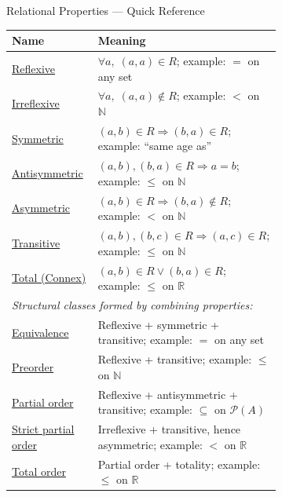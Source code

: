

\begin{toolkitbox}{Relational Properties --- Quick Reference}
\small
\begin{tabular}{l p{0.68\linewidth}}
\toprule
\textbf{Name}  & \textbf{Meaning} \\
\midrule
\hyperref[def:reflexive]{Reflexive}       & $\forall a,\; (a,a)\in R$; example: $=$ on any set \\
\hyperref[def:irreflexive]{Irreflexive}     & $\forall a,\; (a,a)\notin R$; example: $<$ on $\mathbb{N}$ \\
\hyperref[def:symmetric]{Symmetric}       & $(a,b)\in R \Rightarrow (b,a)\in R$; example: ``same age as'' \\
\hyperref[def:antisymmetric]{Antisymmetric}   & $(a,b),(b,a)\in R \Rightarrow a=b$; example: $\leq$ on $\mathbb{N}$ \\
\hyperref[def:asymmetric]{Asymmetric}      & $(a,b)\in R \Rightarrow (b,a)\notin R$; example: $<$ on $\mathbb{N}$ \\
\hyperref[def:transitive]{Transitive}      & $(a,b),(b,c)\in R \Rightarrow (a,c)\in R$; example: $\leq$ on $\mathbb{N}$ \\
\hyperref[def:total-rel]{Total (Connex)}  & $(a,b)\in R \lor (b,a)\in R$; example: $\leq$ on $\mathbb{R}$ \\
\midrule
\multicolumn{2}{l}{\textit{Structural classes formed by combining properties:}} \\
\midrule
\hyperref[def:equivalence-rel]{Equivalence}     & Reflexive + symmetric + transitive; example: $=$ on any set \\
\hyperref[def:preorder]{Preorder}        & Reflexive + transitive; example: $\leq$ on $\mathbb{N}$ \\
\hyperref[def:partial-order]{Partial order}   & Reflexive + antisymmetric + transitive; example: $\subseteq$ on $\mathcal{P}(A)$ \\
\hyperref[def:strict-partial-order-relations]{Strict partial order}   & Irreflexive + transitive, hence asymmetric; example: $<$ on $\mathbb{R}$ \\
\hyperref[def:total-order]{Total order}     & Partial order + totality; example: $\leq$ on $\mathbb{R}$ \\
\bottomrule
\end{tabular}
\end{toolkitbox}


